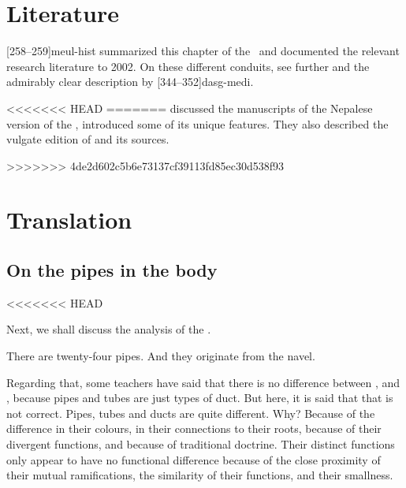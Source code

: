 \begin{refsection}
\section{Literature}

[258--259]{meul-hist} summarized this chapter of the \SS\
and documented the relevant research literature to 2002. On these
different conduits, see further
\cites[404--406]{wuja-2022}[xlvi--xlvii]{wuja-2003}[26--28]{ray-1980}[23--29 
and tables]{kutu-1962} and the admirably clear description by 
[344--352]{dasg-medi}.

<<<<<<< HEAD
=======
\citet{wuja-2023} discussed the manuscripts of the Nepalese version of the \SS, introduced some of its unique features.  They also described the vulgate edition of \citet{vulgate} and its sources.

>>>>>>> 4de2d602c5b6e73137cf39113fd85ec30d538f93
\newpage

\section{Translation}

\begin{translation}

\subsection{On the pipes in the body}

<<<<<<< HEAD
    \item [1]

    Next, we shall discuss the analysis  of the .

    \item[3]

    There are twenty-four pipes.  And they originate from the navel.

    Regarding that, some teachers have said that there is no difference
    between \sepl{sirā}{duct}, \sepl{dhamanī}{pipe} and
    , because pipes and tubes are just types of duct.
    But here, it is said that that is not correct. Pipes, tubes  and ducts
    are quite different. Why? Because of the difference in their colours,
    in their connections to their roots, because of their divergent
    functions, and because of traditional doctrine. Their distinct
    functions only appear to have no functional difference because of the
    close proximity of their mutual ramifications, the similarity of their
    functions, and their smallness.


\end{translation}
\end{refsection}
